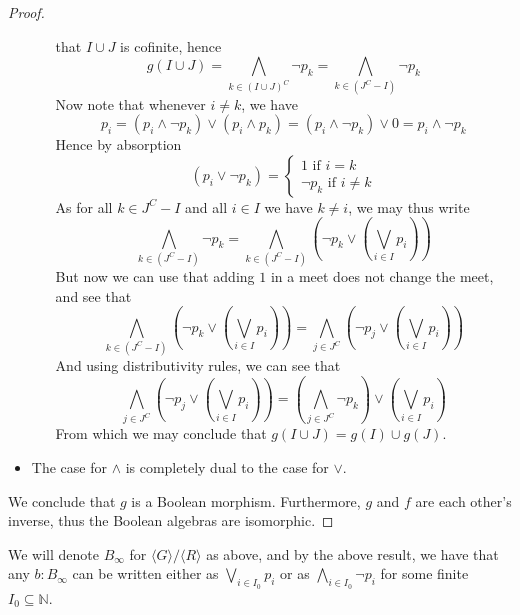 \documentclass{../util/zariski-small}
\begin{document}
\begin{example}
\begin{proof}
\begin{itemize}
\begin{itemize}
          that $I\cup J$ is cofinite, hence 
          \begin{equation}
            g(I\cup J) = \bigwedge_{k\in (I \cup J)^C} \neg p_k
            = \bigwedge_{k \in (J^C -I)} \neg p_k
          \end{equation}
          Now note that 
          whenever $i\neq k$, we have 
          \begin{equation}
            p_i = (p_i \wedge \neg p_k) \vee (p_i \wedge p_k) = 
            (p_i \wedge \neg p_k) \vee 0 = p_i \wedge \neg p_k
          \end{equation}
          Hence by absorption
          \begin{equation} 
            (p_i \vee \neg p_k)  =
              \begin{cases}
                1 \text{ if } i = k \\
                \neg p_k \text{ if } i \neq k
              \end{cases}
          \end{equation}
          As for all $k\in J^C-I$ and all $i\in I$ we have $k\neq i$, we may thus write
          \begin{equation}
            \bigwedge_{k \in (J^C - I)} \neg p_k = 
            \bigwedge_{k \in (J^C - I)} (\neg p_k \vee (\bigvee_{i\in I} p_i))
          \end{equation}
          But now we can use that adding $1$ in a meet does not change the meet, and see that 
          \begin{equation}
            \bigwedge_{k \in (J^C - I)} (\neg p_k \vee (\bigvee_{i\in I} p_i))
            = 
            \bigwedge_{j \in J^C} (\neg p_j \vee (\bigvee_{i\in I} p_i))
          \end{equation}
          And using distributivity rules, we can see that 
          \begin{equation}
            \bigwedge_{j \in J^C} (\neg p_j \vee (\bigvee_{i\in I} p_i))
            = 
            (\bigwedge_{j \in J^C} \neg p_k) \vee (\bigvee_{i\in I} p_i)
          \end{equation}
          From which we may conclude that $g(I\cup J) = g(I) \cup g(J)$. 
      \end{itemize}
    \item The case for $\wedge$ is completely dual to the case for $\vee$. 
  \end{itemize}
We conclude that $g$ is a Boolean morphism. 
Furthermore, $g$ and $f$ are each other's inverse, thus the Boolean algebras are isomorphic. 
\end{proof}
\end{example}
\begin{remark}
  We will denote $B_\infty$ for $\langle G \rangle/ \langle R\rangle $ as above, 
  and by the above result, we have that any $b:B_\infty$ can be written 
  either as $\bigvee_{i\in I_0} p_i$ or as $\bigwedge_{i\in I_0} \neg p_i$ for some finite $I_0\subseteq \mathbb N$. 
\end{remark}
\end{document}
